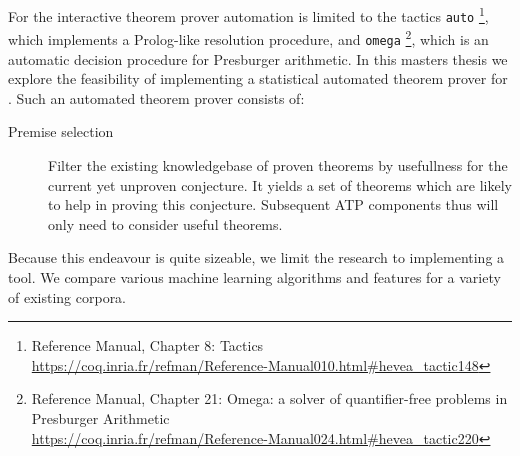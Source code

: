For the \coq interactive theorem prover automation is limited to the tactics \texttt{auto}%
\footnote{\coq Reference Manual, Chapter 8: Tactics\\\url{https://coq.inria.fr/refman/Reference-Manual010.html\#hevea_tactic148}},
which implements a Prolog-like resolution procedure, and \texttt{omega}%
\footnote{\coq Reference Manual, Chapter 21: Omega: a solver of quantifier-free problems in Presburger Arithmetic\\\url{https://coq.inria.fr/refman/Reference-Manual024.html\#hevea_tactic220}},
which is an automatic decision procedure for Presburger arithmetic.
In this masters thesis we explore the feasibility of implementing a statistical automated theorem prover for \coq.
Such an automated theorem prover consists of:
\begin{description}
\item[Premise selection] Filter the existing knowledgebase of proven theorems by usefullness for the current yet unproven conjecture.
It yields a set of theorems which are likely to help in proving this conjecture.
Subsequent ATP components thus will only need to consider useful theorems. 
\item[]
\end{description}

Because this endeavour is quite sizeable, we limit the research to implementing a \premiseselection tool.
We compare various machine learning algorithms and features for a variety of existing \coq corpora.
